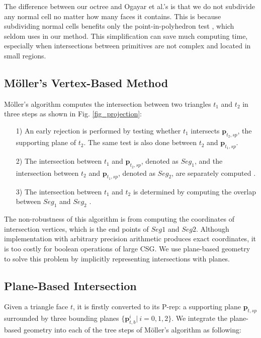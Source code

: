 \documentclass[10pt,journal,compsoc]{IEEEtran}
\begin{document}
The difference between our octree and Ogayar et al.'s is that we do not subdivide any normal cell no matter how many faces it contains. This is because subdividing normal cells benefits only the point-in-polyhedron test  \cite{frisken2002simple}, which seldom uses in our method. This simplification can save much computing time, especially when intersections between primitives are not complex and located in small regions.


\subsection{M\"{o}ller's Vertex-Based Method}



M\"{o}ller's algorithm computes the intersection between two triangles $t_1$ and $t_2$ in three steps as shown in Fig. \ref{fig_projection}:
\begin{itemize}[leftmargin=0.45cm]
\item[1)] An early rejection is performed by testing whether $t_1$ intersects $\bm{p}_{t_2, sp}$, the supporting plane of $t_2$. The same test is also done between $t_2$ and $\bm{p}_{t_1, sp}$.
\item[2)]The intersection between $t_1$ and $\bm{p}_{t_2, sp}$, denoted as $Seg_1$, and the intersection between $t_2$ and $\bm{p}_{t_1, sp}$, denoted as $Seg_2$, are separately computed .
 \item[3)]The intersection between $t_1$ and $t_2$ is determined by computing the overlap between $Seg_1$ and $Seg_2$ .
\end{itemize}

The non-robustness of this algorithm is from computing the coordinates of intersection vertices, which is the end points of $Seg1$ and $Seg2$. Although implementation with arbitrary precision arithmetic produces exact coordinates, it is too costly for boolean operations of large CSG. We use plane-based geometry to solve this problem by implicitly representing intersections with planes.


\subsection{Plane-Based Intersection}

\label{sec:embed}
Given a triangle face $t$, it is firstly converted to its P-rep: a supporting plane $\bm{p}_{t, sp}$ surrounded by three bounding planes $\{\bm{p}_{t, b}^i|\ i = 0,1,2\}$. We integrate the plane-based geometry into each of the tree steps of M\"{o}ller's algorithm as following:
\end{document}
